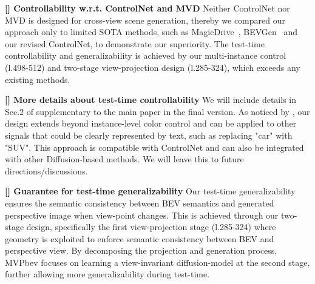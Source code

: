 \documentclass[sigconf,authordraft]{acmart}
\begin{document}
\noindent \textbf{[\rtwo] Controllability w.r.t. ControlNet and MVD} Neither ControlNet nor MVD is designed for cross-view scene generation, thereby we compared our approach only to limited SOTA methods, such as MagicDrive~\cite{gao2023magicdrive}, BEVGen~\cite{swerdlow2023street} and our revised ControlNet, to demonstrate our superiority. The test-time controllability and generalizability is achieved by our multi-instance control (l.498-512) and two-stage view-projection design (l.285-324), which exceeds any existing methods.

\noindent \textbf{[\rtwo] More details about test-time controllability} We will include details in Sec.2 of supplementary to the main paper in the final version. As noticed by \rtwo, our design extends beyond instance-level color control and can be applied to other signals that could be clearly represented by text, such as replacing "car" with "SUV". This approach is compatible with ControlNet and can also be integrated with other Diffusion-based methods. We will leave this to future directions/discussions.

\noindent \textbf{[\rtwo] Guarantee for test-time generalizability} Our test-time generalizability ensures the semantic consistency between BEV semantics and generated perspective image when view-point changes. This is achieved through our two-stage design, specifically the first view-projection stage (l.285-324) where geometry is exploited to enforce semantic consistency between BEV and perspective view. By decomposing the projection and generation process, MVPbev focuses on learning a view-invariant diffusion-model at the second stage, further allowing more generalizability during test-time.
\end{document}
